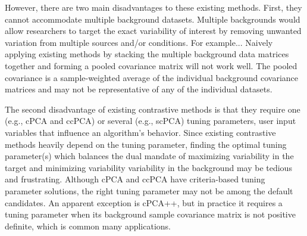 \documentclass[12pt]{article}
\begin{document}
   
   However, there are two main disadvantages to these existing methods. First, they cannot accommodate multiple background datasets. Multiple backgrounds would allow researchers to target the exact variability of interest by removing unwanted variation from multiple sources and/or conditions. For example...
   Naively applying existing methods by stacking the multiple background data matrices together and forming a pooled covariance matrix will not work well. The pooled covariance is a sample-weighted average of the individual background covariance matrices and may not be representative of any of the individual datasets. %
   
   The second disadvantage of existing contrastive methods is that they require one (e.g., cPCA and ccPCA) or several (e.g., scPCA) tuning parameters, user input variables that influence an algorithm's behavior. Since existing contrastive methods heavily depend on the tuning parameter, finding the optimal tuning parameter(s) which balances the dual mandate of maximizing variability in the target and minimizing variability variability in the background may be tedious and frustrating. Although cPCA and ccPCA have criteria-based tuning parameter solutions, the right tuning parameter may not be among the default candidates. An apparent exception is cPCA++, but in practice it requires a tuning parameter when its background sample covariance matrix is not positive definite, which is common many applications.
   
\end{document}
